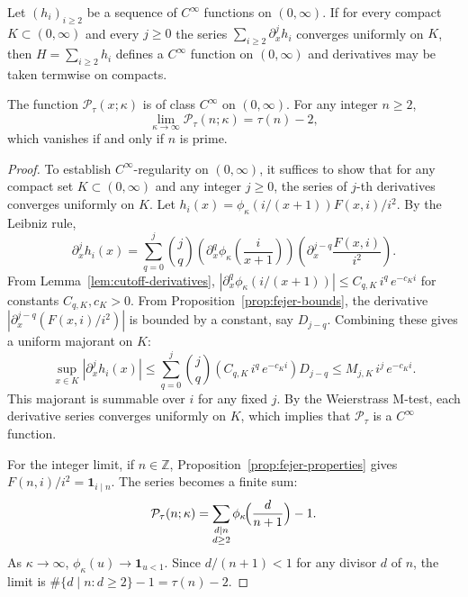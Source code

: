 \begin{lemma}\label{lem:local_uniform_smooth}
Let $(h_i)_{i\ge2}$ be a sequence of $C^\infty$ functions on $(0,\infty)$. If for every compact $K\subset(0,\infty)$ and every $j\ge0$ the series $\sum_{i\ge2}\partial_x^j h_i$ converges uniformly on $K$, then $H=\sum_{i\ge2} h_i$ defines a $C^\infty$ function on $(0,\infty)$ and derivatives may be taken termwise on compacts.
\end{lemma}

\begin{proposition}\label{prop:Ptau-properties}
The function $\mathcal{P}_{\tau}(x;\kappa)$ is of class $C^\infty$ on $(0,\infty)$. For any integer $n\ge2$,
\[
\lim_{\kappa\to\infty} \mathcal{P}_{\tau}(n; \kappa) = \tau(n)-2,
\]
which vanishes if and only if $n$ is prime.
\end{proposition}
\begin{proof}
To establish $C^\infty$-regularity on $(0,\infty)$, it suffices to show that for any compact set $K\subset(0,\infty)$ and any integer $j\ge0$, the series of $j$-th derivatives converges uniformly on $K$. Let $h_i(x) = \phi_{\kappa}(i/(x+1)) F(x,i)/i^2$. By the Leibniz rule,
\[
\partial_x^j h_i(x) = \sum_{q=0}^j \binom{j}{q} \left( \partial_x^q \phi_{\kappa}\!\left(\frac{i}{x+1}\right) \right) \left( \partial_x^{j-q} \frac{F(x,i)}{i^2} \right).
\]
From Lemma~\ref{lem:cutoff-derivatives}, $|\partial_x^q \phi_{\kappa}(i/(x+1))| \le C_{q,K} \, i^q \, e^{-c_K i}$ for constants $C_{q,K}, c_K > 0$. From Proposition~\ref{prop:fejer-bounds}, the derivative $|\partial_x^{j-q} (F(x,i)/i^2)|$ is bounded by a constant, say $D_{j-q}$. Combining these gives a uniform majorant on $K$:
\[
\sup_{x\in K} |\partial_x^j h_i(x)| \le \sum_{q=0}^j \binom{j}{q} (C_{q,K} \, i^q \, e^{-c_K i}) D_{j-q} \le M_{j,K} \, i^{j} \, e^{-c_K i}.
\]
This majorant is summable over $i$ for any fixed $j$. By the Weierstrass M-test, each derivative series converges uniformly on $K$, which implies that $\mathcal{P}_{\tau}$ is a $C^\infty$ function.

For the integer limit, if $n\in\mathbb Z$, Proposition~\ref{prop:fejer-properties} gives $F(n,i)/i^2 = \mathbf{1}_{i\mid n}$. The series becomes a finite sum:
\[
\mathcal{P}_{\tau}(n;\kappa)=\sum_{\substack{d\mid n\\ d\ge2}} \phi_{\kappa}\!\Bigl(\frac{d}{n+1}\Bigr)-1.
\]
As $\kappa\to\infty$, $\phi_{\kappa}(u)\to\mathbf 1_{u<1}$. Since $d/(n+1)<1$ for any divisor $d$ of $n$, the limit is $\#\{d\mid n: d\ge2\}-1 = \tau(n)-2$.
\end{proof}

